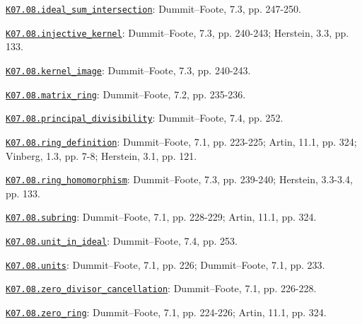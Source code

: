 \par\smallskip\noindent\hypertarget{src:K07.08.ideal_sum_intersection}{}\label{src:K07.08.ideal_sum_intersection}\hyperref[K07.08.ideal_sum_intersection]{\texttt{K07.08.ideal\_sum\_intersection}}: Dummit--Foote, 7.3, pp. 247-250.
\par\smallskip\noindent\hypertarget{src:K07.08.injective_kernel}{}\label{src:K07.08.injective_kernel}\hyperref[K07.08.injective_kernel]{\texttt{K07.08.injective\_kernel}}: Dummit--Foote, 7.3, pp. 240-243; Herstein, 3.3, pp. 133.
\par\smallskip\noindent\hypertarget{src:K07.08.kernel_image}{}\label{src:K07.08.kernel_image}\hyperref[K07.08.kernel_image]{\texttt{K07.08.kernel\_image}}: Dummit--Foote, 7.3, pp. 240-243.
\par\smallskip\noindent\hypertarget{src:K07.08.matrix_ring}{}\label{src:K07.08.matrix_ring}\hyperref[K07.08.matrix_ring]{\texttt{K07.08.matrix\_ring}}: Dummit--Foote, 7.2, pp. 235-236.
\par\smallskip\noindent\hypertarget{src:K07.08.principal_divisibility}{}\label{src:K07.08.principal_divisibility}\hyperref[K07.08.principal_divisibility]{\texttt{K07.08.principal\_divisibility}}: Dummit--Foote, 7.4, pp. 252.
\par\smallskip\noindent\hypertarget{src:K07.08.ring_definition}{}\label{src:K07.08.ring_definition}\hyperref[K07.08.ring_definition]{\texttt{K07.08.ring\_definition}}: Dummit--Foote, 7.1, pp. 223-225; Artin, 11.1, pp. 324; Vinberg, 1.3, pp. 7-8; Herstein, 3.1, pp. 121.
\par\smallskip\noindent\hypertarget{src:K07.08.ring_homomorphism}{}\label{src:K07.08.ring_homomorphism}\hyperref[K07.08.ring_homomorphism]{\texttt{K07.08.ring\_homomorphism}}: Dummit--Foote, 7.3, pp. 239-240; Herstein, 3.3-3.4, pp. 133.
\par\smallskip\noindent\hypertarget{src:K07.08.subring}{}\label{src:K07.08.subring}\hyperref[K07.08.subring]{\texttt{K07.08.subring}}: Dummit--Foote, 7.1, pp. 228-229; Artin, 11.1, pp. 324.
\par\smallskip\noindent\hypertarget{src:K07.08.unit_in_ideal}{}\label{src:K07.08.unit_in_ideal}\hyperref[K07.08.unit_in_ideal]{\texttt{K07.08.unit\_in\_ideal}}: Dummit--Foote, 7.4, pp. 253.
\par\smallskip\noindent\hypertarget{src:K07.08.units}{}\label{src:K07.08.units}\hyperref[K07.08.units]{\texttt{K07.08.units}}: Dummit--Foote, 7.1, pp. 226; Dummit--Foote, 7.1, pp. 233.
\par\smallskip\noindent\hypertarget{src:K07.08.zero_divisor_cancellation}{}\label{src:K07.08.zero_divisor_cancellation}\hyperref[K07.08.zero_divisor_cancellation]{\texttt{K07.08.zero\_divisor\_cancellation}}: Dummit--Foote, 7.1, pp. 226-228.
\par\smallskip\noindent\hypertarget{src:K07.08.zero_ring}{}\label{src:K07.08.zero_ring}\hyperref[K07.08.zero_ring]{\texttt{K07.08.zero\_ring}}: Dummit--Foote, 7.1, pp. 224-226; Artin, 11.1, pp. 324.
